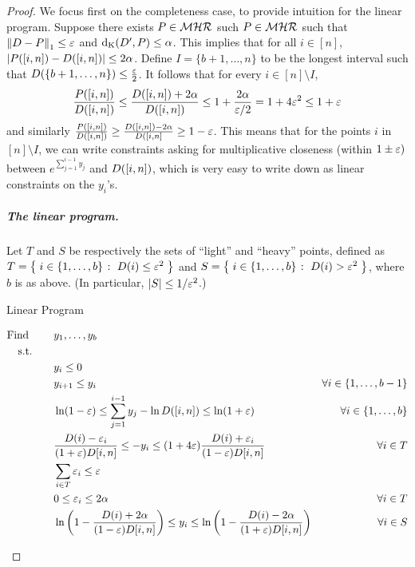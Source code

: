 \begin{proof}
We focus first on the completeness case, to provide intuition for the linear program. Suppose there exists $P\in\mathcal{MHR}$ such $P\in\mathcal{MHR}$ such that ${\lVert D-P{\rVert}}_1 \leq \varepsilon$  and ${\operatorname{d_{\textrm{K}}}\!\left({D^\prime, P}\right)} \leq \alpha$. This implies that for all $i\in[n]$, $\left\lvert  P([i,n]) - D([i,n])  \right\rvert \leq 2\alpha$. Define $I=\{b+1,\dots,n\}$ to be the longest interval such that $D(\{b+1,\dots,n\})\leq \frac{\varepsilon}{2}$. It follows that for every $i\in [n]\setminus I$,
\begin{equation}\label{eq:mhr:mult:approx:cdf}
    \frac{P([i,n])}{D([i,n])} \leq \frac{D([i,n])+2\alpha}{D([i,n])} \leq 1+\frac{2\alpha}{\varepsilon/2} = 1+4\varepsilon^2 \leq 1+\varepsilon
\end{equation}
and similarly
$
    \frac{P([i,n])}{D([i,n])} \geq \frac{D([i,n])-2\alpha}{D([i,n]} \geq 1-\varepsilon
$.
This means that for the points $i$ in $[n]\setminus I$, we can write constraints asking for multiplicative closeness (within $1\pm \varepsilon)$ between $e^{\sum_{j=1}^{i-1} y_j}$ and $D([i,n])$, which is very easy to write down as linear constraints on the $y_i$'s.

\subparagraph{The linear program.} 
Let $T$ and $S$ be respectively the sets of ``light'' and ``heavy'' points, defined as $T=\left\{\;  i\in \{1,\dots,b\}  \;\colon\;  D(i) \leq \varepsilon^2 \; \right\}$ and  $S=\left\{\;  i\in \{1,\dots,b\}  \;\colon\;  D(i) > \varepsilon^2 \; \right\}$, where $b$ is as above. (In particular, $\left\lvert S \right\rvert \leq 1/\varepsilon^2$.)

\begin{algorithm}
\caption{\label{algo:lp:mhr}Linear Program}
  \begin{align}
  \text{Find }\qquad  & y_1,\dots,y_b & \notag\\
  \text{s.t.}\qquad & \hfill& \notag\\
   &y_i \leq 0 &     \label{lp:mhr:01}\\
   & y_{i+1} \leq y_{i} & \forall i \in \{1,\dots,b-1\}     \label{lp:mhr}\\
   & \ln\!\left(1-\eps\right)  \leq \sum_{j=1}^{i-1} y_{j} - \ln \D([i,n]) \leq  \ln\!\left(1+\eps\right) & \forall i \in \{1,\dots,b\}     \label{lp:mhr:mult:close}\\
   &\frac{\D(i)-\eps_i}{(1+\eps)\D[i,n]} \leq -y_i \leq (1+4\eps)\frac{\D(i)+\eps_i}{(1-\eps)\D[i,n]}      & \forall i\in T  \label{lp:mhr:bound:yi}\\
    &\sum_{i\in T} \eps_i \leq \eps \label{lp:mhr:bound:sum:epsi}\\
    & 0 \leq \eps_i \leq 2\alpha & \forall i\in T \label{lp:mhr:noneg:epsi}\\
    & \ln\left( 1-\frac{\D(i)+2\alpha}{(1-\eps)\D[i,n]} \right) \leq y_i \leq \ln\left( 1-\frac{\D(i)-2\alpha}{(1+\eps)\D[i,n]} \right) & \forall i\in S \label{lp:mhr:heavypoints}
  \end{align}
\end{algorithm}


\end{proof}
